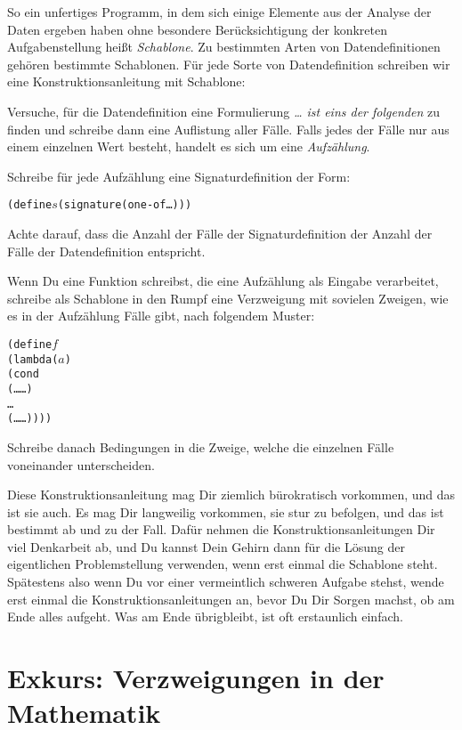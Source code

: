 So ein unfertiges Programm, in dem sich einige Elemente aus der
Analyse der Daten ergeben haben ohne besondere Berücksichtigung der
konkreten Aufgabenstellung heißt \textit{Schablone}.  Zu bestimmten
Arten von Datendefinitionen gehören bestimmte Schablonen.  Für jede
Sorte von Datendefinition schreiben wir eine Konstruktionsanleitung
mit Schablone:
%
\begin{konstruktionsanleitung}[Aufzählung]
  Versuche, für die Datendefinition eine Formulierung \emph{\ldots{}
    ist eins der folgenden} zu finden und schreibe dann eine
  Auflistung aller Fälle.  Falls jedes der Fälle nur aus einem
  einzelnen Wert besteht, handelt es sich um eine
  \textit{Aufzählung}.

  Schreibe für jede Aufzählung eine Signaturdefinition der Form:
\begin{alltt}
(define \(s\) (signature (one-of \ldots)))
\end{alltt}
  Achte darauf, dass die Anzahl der Fälle der Signaturdefinition der
  Anzahl der Fälle der Datendefinition entspricht.
  
  Wenn Du eine Funktion schreibst, die eine Aufzählung als Eingabe
  verarbeitet, schreibe als Schablone in den Rumpf eine Verzweigung
  mit sovielen Zweigen, wie es in der Aufzählung Fälle gibt, nach
  folgendem Muster:
\begin{alltt}
(define \(f\)
  (lambda (\(a\))
    (cond
      (\ldots{} \ldots)
      \ldots
      (\ldots{} \ldots))))
\end{alltt}
  Schreibe danach Bedingungen in die Zweige, welche die einzelnen
  Fälle voneinander unterscheiden.
\end{konstruktionsanleitung}
%
Diese Konstruktionsanleitung mag Dir ziemlich bürokratisch vorkommen,
und das ist sie auch.  Es mag Dir langweilig vorkommen, sie stur zu
befolgen, und das ist bestimmt ab und zu der Fall.  Dafür nehmen die
Konstruktionsanleitungen Dir viel Denkarbeit ab, und Du kannst Dein
Gehirn dann für die Lösung der eigentlichen Problemstellung verwenden,
wenn erst einmal die Schablone steht.  Spätestens also wenn Du vor
einer vermeintlich schweren Aufgabe stehst, wende erst einmal die
Konstruktionsanleitungen an, bevor Du Dir Sorgen machst, ob am Ende
alles aufgeht.  Was am Ende übrigbleibt, ist oft erstaunlich einfach.

\section{Exkurs: Verzweigungen in der Mathematik}

